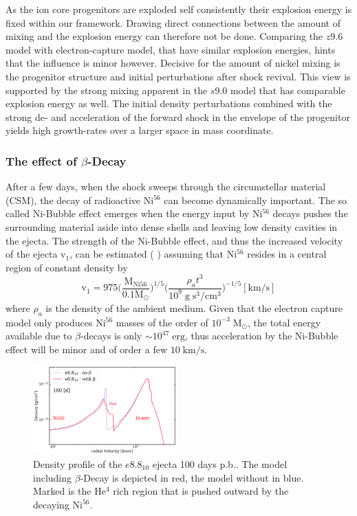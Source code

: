 \documentclass[fleqn,usenatbib]{mnras}
\newcommand{\helium}{$\mathrm{He^{4}}$\xspace}
\newcommand{\nickel}{$\mathrm{Ni^{56}}$\xspace}
\begin{document}
As the ion core progenitors are exploded self consistently their explosion energy is fixed within our framework. Drawing direct connections between the amount of mixing and the explosion energy can therefore not be done. Comparing the $z9.6$ model with electron-capture model, that have similar explosion energies, hints that the influence is minor however. Decisive for the amount of nickel mixing is the progenitor structure and initial perturbations after shock revival. This view is supported by the strong mixing apparent in the $s9.0$ model that has comparable explosion energy as well. The initial density perturbations combined with the strong de- and acceleration of the forward shock in the envelope of the progenitor yields high growth-rates over a larger space in mass coordinate. 

\subsubsection{The effect of $\beta$-Decay}
After a few days, when the shock sweeps through the circumstellar material (CSM), the decay of radioactive \nickel can become dynamically important. The so called Ni-Bubble effect emerges when the energy input by \nickel decays pushes the surrounding material aside into dense shells and leaving low density cavities in the ejecta. The strength of the Ni-Bubble effect, and thus the increased velocity of the ejecta $\mathrm{v}_1$,  can be estimated (\cite{Chevalier2005} ) assuming that \nickel resides in a central region of constant density by
\begin{equation}
\mathrm{v_1} = 975\Big(\frac{\mathrm{M_{Ni56}}}{0.1\mathrm{M_{\odot}}} \Big)^{1/5} \Big( \frac{\rho_a t^3} {10^9 \mathrm{\;g\;s^3/cm^3}}\Big)^{-1/5} \mathrm{[km/s]}
\end{equation}
where $\rho_a$ is the density of the ambient medium. Given that the electron capture model only produces \nickel masses of the order of $10^{-3}\;\mathrm{M_{\odot}}$, the total energy available due to $\beta$-decays is only $\sim 10^{47}\;\mathrm{erg}$, thus acceleration by the Ni-Bubble effect will be minor and of order a few $10\;\mathrm{km/s}$.

\begin{figure}
 \label{fig:e8_beta}
 \centering
 \includegraphics[width=0.49\textwidth]{./pic/e8_10_beta_nobeta_den_vs_vr.pdf}
 \caption{Density profile of the $e8.8_{10}$ ejecta 100 days p.b.. The model including $\beta$-Decay is depicted in red, the model without in blue. Marked is the \helium rich region that is pushed outward by the decaying \nickel. }
\end{figure}
\end{document}
